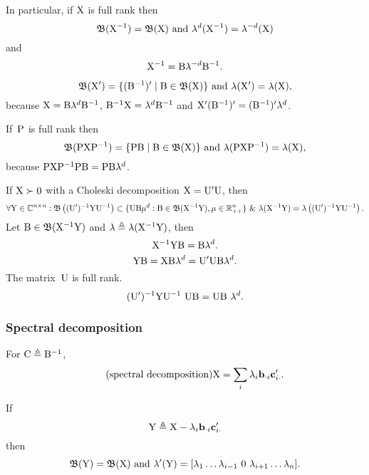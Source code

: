 \documentclass[10pt,a4paper]{article}
\theoremstyle{plain} \newtheorem{Lem}{Lemma}
\begin{document}
\bigskip
In particular, if $\mathrm X$ is full rank then
$$\mathfrak B(\mathrm X^{-1}) = \mathfrak B(\mathrm X) \text{ and } \mathbf \lambda^d(\mathrm X^{-1}) = \mathbf \lambda^{-d} (\mathrm X) $$
and
$$ \mathrm X^{-1} = \mathrm B \mathbf \lambda^{-d} \mathrm B^{-1}. $$

\bigskip
$$ \mathfrak B(\mathrm X') = \{(\mathrm B^{-1})' \mid \mathrm B \in \mathfrak B(\mathrm X)\} \text{ and } \mathbf \lambda(\mathrm X') = \mathbf \lambda(\mathrm X), $$
because
$\mathrm X = \mathrm B \mathbf \lambda^d \mathrm B^{-1}$, 
$\mathrm B^{-1} \mathrm X = \mathbf \lambda^d \mathrm B^{-1}$
and
$\mathrm X' (\mathrm B^{-1})' = (\mathrm B^{-1})' \mathbf \lambda^d$.

\bigskip
If~$\mathrm P$ is full rank then
$$ \mathfrak B(\mathrm P \mathrm X \mathrm P^{-1}) = \{\mathrm P \mathrm B \mid \mathrm B \in \mathfrak B(\mathrm X)\} \text{ and } \mathbf \lambda(\mathrm P \mathrm X \mathrm P^{-1}) = \mathbf \lambda(\mathrm X), $$
because $\mathrm P \mathrm X \mathrm P^{-1} \mathrm P \mathrm B = \mathrm P \mathrm B \mathbf \lambda^d$.

\bigskip
If $\mathrm X \succ 0$ with a Choleski decomposition $\mathrm X = \mathrm U' \mathrm U$,
then
\begin{equation} \label{eigenPdY}
  \forall \mathrm Y \in \mathbb C^{n \times n} : 
    \mathfrak B \left((\mathrm U')^{-1} \mathrm Y \mathrm U^{-1} \right) \subset \{\mathrm U \mathrm B \mathbf \mu^d: \mathrm B \in \mathfrak B(\mathrm X^{-1} \mathrm Y), \mathbf \mu \in \mathbb R_{++}^n\} 
    \ \& \  \mathbf \lambda(\mathrm X^{-1} \mathrm Y) = \mathbf \lambda \left( (\mathrm U')^{-1} \mathrm Y \mathrm U^{-1} \right).
\end{equation}
\proof
{
Let $\mathrm B \in \mathfrak B(\mathrm X^{-1} \mathrm Y)$ and $\mathbf \lambda \triangleq \mathbf \lambda(\mathrm X^{-1} \mathrm Y)$,
then
$$ \mathrm X^{-1} \mathrm Y \mathrm B = \mathrm B \mathbf \lambda^d. $$
$$ \mathrm Y \mathrm B = \mathrm X \mathrm B \mathbf \lambda^d = \mathrm U' \mathrm U \mathrm B \mathbf \lambda^d. $$
The matrix~$\mathrm U$ is full rank.
$$ (\mathrm U')^{-1} \mathrm Y \mathrm U^{-1} \ \mathrm U \mathrm B = \mathrm U \mathrm B \ \mathbf \lambda^d. $$
}

\subsubsection {Spectral decomposition}
For $\mathrm C \triangleq \mathrm B^{-1}$,
\begin{equation*} \tag{spectral decomposition}
\mathrm X = \sum_i \lambda_i \mathbf b_{\cdot i} \mathbf c_{i \cdot}'.
\end{equation*}

If  
$$\mathrm Y \triangleq \mathrm X - \lambda_i \mathbf b_{\cdot i} \mathbf c_{i \cdot}'$$ 
then 
$$ \mathfrak B(\mat Y) = \mathfrak B(\mat X) \text{ and } \ve \lambda'(\mat Y) = [\lambda_1 \dots \lambda_{i-1} \ 0 \ \lambda_{i+1} \dots \lambda_n]. $$
\end{document}
